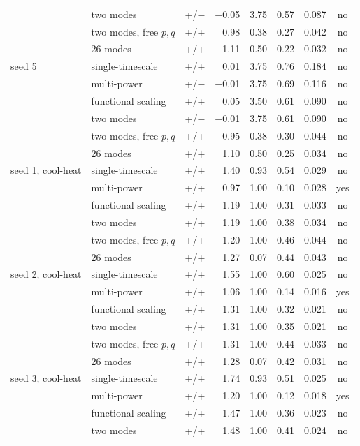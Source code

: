 \begin{longtable}{llcrrrrc}
 & two modes & +/$-$ & $-$0.05 & 3.75 & 0.57 & 0.087 & no\\
 & two modes, free $p,q$ & +/+ & 0.98 & 0.38 & 0.27 & 0.042 & no\\
 & 26 modes & +/+ & 1.11 & 0.50 & 0.22 & 0.032 & no\\
\addlinespace
seed 5 & single-timescale & +/+ & 0.01 & 3.75 & 0.76 & 0.184 & no\\
 & multi-power & +/$-$ & $-$0.01 & 3.75 & 0.69 & 0.116 & no\\
 & functional scaling & +/+ & 0.05 & 3.50 & 0.61 & 0.090 & no\\
 & two modes & +/$-$ & $-$0.01 & 3.75 & 0.61 & 0.090 & no\\
 & two modes, free $p,q$ & +/+ & 0.95 & 0.38 & 0.30 & 0.044 & no\\
 & 26 modes & +/+ & 1.10 & 0.50 & 0.25 & 0.034 & no\\
\addlinespace
seed 1, cool-heat & single-timescale & +/+ & 1.40 & 0.93 & 0.54 & 0.029 & no\\
 & multi-power & +/+ & 0.97 & 1.00 & 0.10 & 0.028 & yes\\
 & functional scaling & +/+ & 1.19 & 1.00 & 0.31 & 0.033 & no\\
 & two modes & +/+ & 1.19 & 1.00 & 0.38 & 0.034 & no\\
 & two modes, free $p,q$ & +/+ & 1.20 & 1.00 & 0.46 & 0.044 & no\\
 & 26 modes & +/+ & 1.27 & 0.07 & 0.44 & 0.043 & no\\
\addlinespace
seed 2, cool-heat & single-timescale & +/+ & 1.55 & 1.00 & 0.60 & 0.025 & no\\
 & multi-power & +/+ & 1.06 & 1.00 & 0.14 & 0.016 & yes\\
 & functional scaling & +/+ & 1.31 & 1.00 & 0.32 & 0.021 & no\\
 & two modes & +/+ & 1.31 & 1.00 & 0.35 & 0.021 & no\\
 & two modes, free $p,q$ & +/+ & 1.31 & 1.00 & 0.44 & 0.033 & no\\
 & 26 modes & +/+ & 1.28 & 0.07 & 0.42 & 0.031 & no\\
\addlinespace
seed 3, cool-heat & single-timescale & +/+ & 1.74 & 0.93 & 0.51 & 0.025 & no\\
 & multi-power & +/+ & 1.20 & 1.00 & 0.12 & 0.018 & yes\\
 & functional scaling & +/+ & 1.47 & 1.00 & 0.36 & 0.023 & no\\
 & two modes & +/+ & 1.48 & 1.00 & 0.41 & 0.024 & no\\

\end{longtable}
